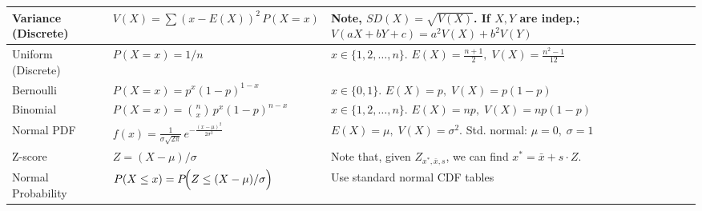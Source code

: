 \documentclass[letterpage]{article}
\begin{document}
\begin{table}[ht!]
\begin{tabular}{|p{}|p{}|p{}|}
\hline
Variance (Discrete) 
& $\displaystyle V(X) = \sum (x - E(X))^2 \, P(X=x)$ 
& Note, $SD(X)=\sqrt{V(X)}$. If $X,Y$ are indep.; $V(aX+bY+c)=a^2V(X)+b^2V(Y)$ \\
\hline
Uniform (Discrete) 
& $\displaystyle P(X = x) = 1/n$
& $x \in \{1,2,\ldots,n\}$. $ E(X) = \frac{n+1}{2},\;
   V(X) = \frac{n^2 - 1}{12}$  \\
\hline
Bernoulli 
& $\displaystyle P(X = x) = p^x (1-p)^{1-x} $
& $x\in\{0,1\}$. $ E(X) = p,\;
   V(X) = p(1-p)$  \\
\hline
Binomial 
& $\displaystyle P(X = x) = \binom{n}{x}\,p^x(1-p)^{n-x}$ 
&  $x \in \{1,2,\ldots,n\}$. $E(X)=np,\;V(X)=np(1-p)$ \\
\hline
Normal PDF 
& $\displaystyle f(x) = \frac{1}{\sigma\sqrt{2\pi}}\,
   e^{-\frac{(x-\mu)^2}{2\sigma^2}}$ 
& $E(X)=\mu,\;V(X)=\sigma^2$. Std. normal: $\mu=0,\;\sigma=1$ \\
\hline
Z-score 
& $\displaystyle Z = (X - \mu)/\sigma$ 
& Note that, given $Z_{x^*,\bar{x},s}$, we can find $x^*= \bar{x}+s\cdot Z$. \\
\hline
Normal Probability 
& $\displaystyle P(X \le x) 
   = P\!\Bigl(Z \le (X - \mu)/\sigma \Bigr)$ 
& Use standard normal CDF tables \\
\hline
\end{tabular}
\end{table}
\end{document}
